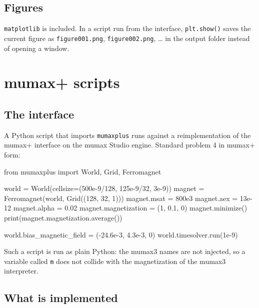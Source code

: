\documentclass[11pt,a4paper,oneside]{book}
\newcommand{\code}[1]{\texttt{#1}}
\renewcommand{\_}{\textunderscore\allowbreak}
\begin{document}
\section{Figures}

\code{matplotlib} is included. In a script run from the interface, \code{plt.show()} saves the current figure as
\code{figure\_001.png}, \code{figure\_002.png}, \ldots{} in the output folder instead of opening a window.

\chapter{mumax+ scripts}\label{ch:plus}

\section{The interface}

A Python script that imports \code{mumaxplus} runs against a reimplementation of the mumax+ interface on the
mumax Studio engine. Standard problem 4 in mumax+ form:
\begin{pycode}
from mumaxplus import World, Grid, Ferromagnet

world = World(cellsize=(500e-9/128, 125e-9/32, 3e-9))
magnet = Ferromagnet(world, Grid((128, 32, 1)))
magnet.msat = 800e3
magnet.aex = 13e-12
magnet.alpha = 0.02
magnet.magnetization = (1, 0.1, 0)
magnet.minimize()
print(magnet.magnetization.average())

world.bias_magnetic_field = (-24.6e-3, 4.3e-3, 0)
world.timesolver.run(1e-9)
\end{pycode}
Such a script is run as plain Python: the mumax3 names are not injected, so a variable called \code{m} does not
collide with the magnetization of the mumax3 interpreter.

\section{What is implemented}
\end{document}
